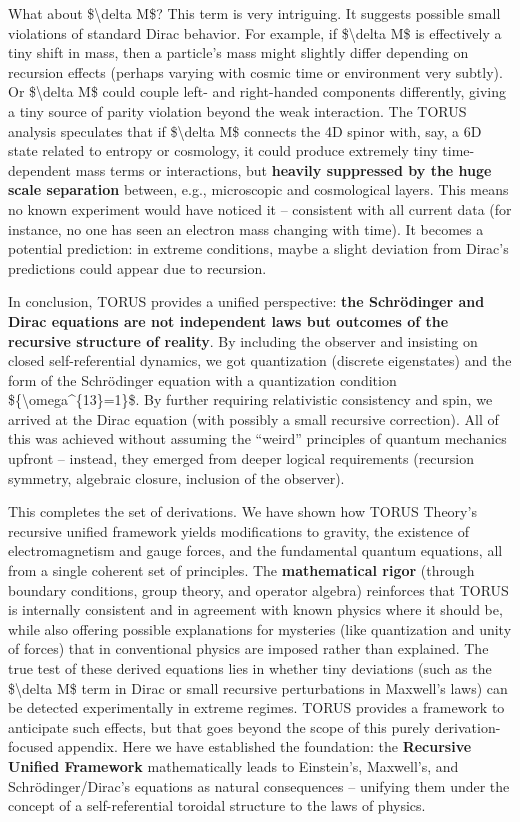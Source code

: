 \documentclass[]{article}
\begin{document}
What about \$\textbackslash{}delta M\$? This term is very intriguing. It
suggests possible small violations of standard Dirac behavior. For
example, if \$\textbackslash{}delta M\$ is effectively a tiny shift in
mass, then a particle's mass might slightly differ depending on
recursion effects (perhaps varying with cosmic time or environment very
subtly). Or \$\textbackslash{}delta M\$ could couple left- and
right-handed components differently, giving a tiny source of parity
violation beyond the weak interaction. The TORUS analysis speculates
that if \$\textbackslash{}delta M\$ connects the 4D spinor with, say, a
6D state related to entropy or cosmology, it could produce extremely
tiny time-dependent mass terms or interactions, but \textbf{heavily
suppressed by the huge scale separation} between, e.g., microscopic and
cosmological layers​. This means no known experiment would have noticed
it -- consistent with all current data (for instance, no one has seen an
electron mass changing with time). It becomes a potential prediction: in
extreme conditions, maybe a slight deviation from Dirac's predictions
could appear due to recursion.

In conclusion, TORUS provides a unified perspective: \textbf{the
Schrödinger and Dirac equations are not independent laws but outcomes of
the recursive structure of reality}. By including the observer and
insisting on closed self-referential dynamics, we got quantization
(discrete eigenstates) and the form of the Schrödinger equation with a
quantization condition \$\{\textbackslash{}omega\^{}\{13\}=1\}\$​. By
further requiring relativistic consistency and spin, we arrived at the
Dirac equation (with possibly a small recursive correction)​. All of
this was achieved without assuming the ``weird'' principles of quantum
mechanics upfront -- instead, they emerged from deeper logical
requirements (recursion symmetry, algebraic closure, inclusion of the
observer).

This completes the set of derivations. We have shown how TORUS Theory's
recursive unified framework yields modifications to gravity, the
existence of electromagnetism and gauge forces, and the fundamental
quantum equations, all from a single coherent set of principles. The
\textbf{mathematical rigor} (through boundary conditions, group theory,
and operator algebra) reinforces that TORUS is internally consistent and
in agreement with known physics where it should be, while also offering
possible explanations for mysteries (like quantization and unity of
forces) that in conventional physics are imposed rather than explained.
The true test of these derived equations lies in whether tiny deviations
(such as the \$\textbackslash{}delta M\$ term in Dirac or small
recursive perturbations in Maxwell's laws) can be detected
experimentally in extreme regimes. TORUS provides a framework to
anticipate such effects​, but that goes beyond the scope of this purely
derivation-focused appendix. Here we have established the foundation:
the \textbf{Recursive Unified Framework} mathematically leads to
Einstein's, Maxwell's, and Schrödinger/Dirac's equations as natural
consequences -- unifying them under the concept of a self-referential
toroidal structure to the laws of physics.
\end{document}
